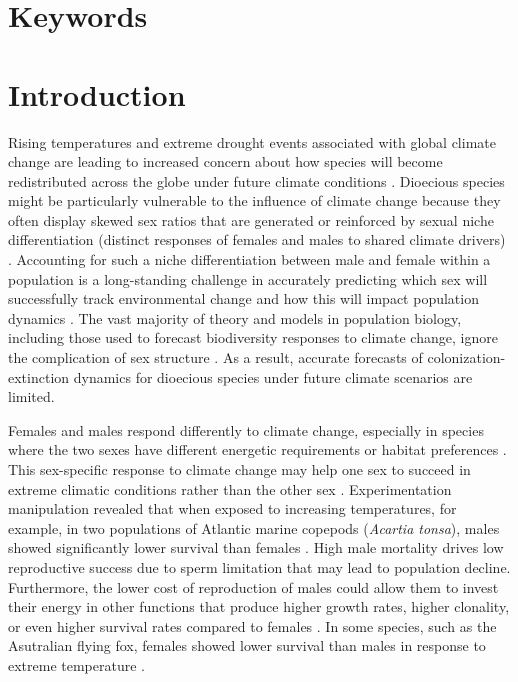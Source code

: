 \documentclass[11pt]{article}
\begin{document}
\section*{Keywords}

\newpage
\section*{Introduction}
Rising temperatures and extreme drought events associated with global climate change are leading to increased concern about how species will become redistributed across the globe under future climate conditions \citep{bertrand2011changes,gamelon2017interactions}.
Dioecious species might be particularly vulnerable to the influence of climate change because they often display skewed sex ratios that are generated or reinforced by sexual niche differentiation (distinct responses of females and males to shared climate drivers) \citep{Tognetti2012}. 
Accounting for such a niche differentiation between male and female within a population is a long-standing challenge in accurately predicting which sex will successfully track environmental change and how this will impact population dynamics \citep{jones1999sex,gissi2023exploring}. 
The vast majority of theory and models in population biology, including those used to forecast biodiversity responses to climate change, ignore the complication of sex structure \citep{pottier2021sexual,ellis2017does}.
As a result, accurate forecasts of colonization-extinction dynamics for dioecious species under future climate scenarios are limited. 

Females and males respond differently to climate change, especially in species where the two sexes have different energetic requirements or habitat preferences \citep{gissi2023exploring,gissi2023sex,hultine2016climate}. 
This sex-specific response to climate change may help one sex to succeed in extreme climatic conditions rather than the other sex \citep{zhao2012sex, burli2022environmental}.
Experimentation manipulation revealed that when exposed to increasing temperatures, for example, in two populations of Atlantic marine copepods (\textit{Acartia tonsa}), males showed significantly lower survival than females \citep{sasaki2019complex}. 
High male mortality drives low reproductive success due to sperm limitation that may lead to population decline.
Furthermore, the lower cost of reproduction of males could allow them to invest their energy in other functions that produce higher growth rates, higher clonality, or even higher survival rates compared to females \citep{cipollini1994sexual, bruijning2017surviving}. 
In some species, such as the Asutralian flying fox, females showed lower survival than males in response to extreme temperature  \citep{welbergen2008climate}.
\end{document}
